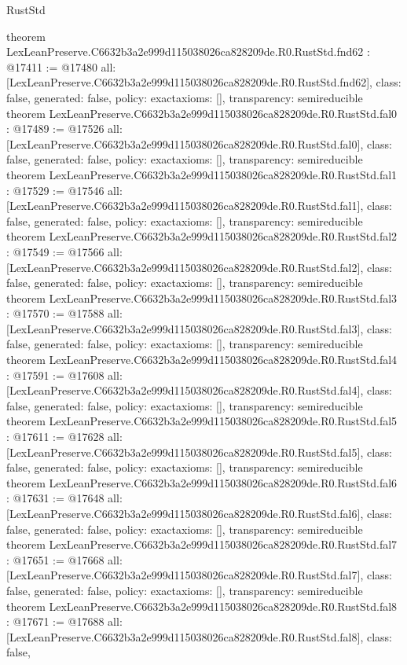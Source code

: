 \begin{lexlean}{RustStd}
\begin{coremodule}
{}
theorem LexLeanPreserve.C6632b3a2e999d115038026ca828209de.R0.RustStd.fnd62 : @17411 := @17480 {
  all: [LexLeanPreserve.C6632b3a2e999d115038026ca828209de.R0.RustStd.fnd62],
  class: false,
  generated: false,
  policy: exact{axioms: []},
  transparency: semireducible
}
theorem LexLeanPreserve.C6632b3a2e999d115038026ca828209de.R0.RustStd.fal0 : @17489 := @17526 {
  all: [LexLeanPreserve.C6632b3a2e999d115038026ca828209de.R0.RustStd.fal0],
  class: false,
  generated: false,
  policy: exact{axioms: []},
  transparency: semireducible
}
theorem LexLeanPreserve.C6632b3a2e999d115038026ca828209de.R0.RustStd.fal1 : @17529 := @17546 {
  all: [LexLeanPreserve.C6632b3a2e999d115038026ca828209de.R0.RustStd.fal1],
  class: false,
  generated: false,
  policy: exact{axioms: []},
  transparency: semireducible
}
theorem LexLeanPreserve.C6632b3a2e999d115038026ca828209de.R0.RustStd.fal2 : @17549 := @17566 {
  all: [LexLeanPreserve.C6632b3a2e999d115038026ca828209de.R0.RustStd.fal2],
  class: false,
  generated: false,
  policy: exact{axioms: []},
  transparency: semireducible
}
theorem LexLeanPreserve.C6632b3a2e999d115038026ca828209de.R0.RustStd.fal3 : @17570 := @17588 {
  all: [LexLeanPreserve.C6632b3a2e999d115038026ca828209de.R0.RustStd.fal3],
  class: false,
  generated: false,
  policy: exact{axioms: []},
  transparency: semireducible
}
theorem LexLeanPreserve.C6632b3a2e999d115038026ca828209de.R0.RustStd.fal4 : @17591 := @17608 {
  all: [LexLeanPreserve.C6632b3a2e999d115038026ca828209de.R0.RustStd.fal4],
  class: false,
  generated: false,
  policy: exact{axioms: []},
  transparency: semireducible
}
theorem LexLeanPreserve.C6632b3a2e999d115038026ca828209de.R0.RustStd.fal5 : @17611 := @17628 {
  all: [LexLeanPreserve.C6632b3a2e999d115038026ca828209de.R0.RustStd.fal5],
  class: false,
  generated: false,
  policy: exact{axioms: []},
  transparency: semireducible
}
theorem LexLeanPreserve.C6632b3a2e999d115038026ca828209de.R0.RustStd.fal6 : @17631 := @17648 {
  all: [LexLeanPreserve.C6632b3a2e999d115038026ca828209de.R0.RustStd.fal6],
  class: false,
  generated: false,
  policy: exact{axioms: []},
  transparency: semireducible
}
theorem LexLeanPreserve.C6632b3a2e999d115038026ca828209de.R0.RustStd.fal7 : @17651 := @17668 {
  all: [LexLeanPreserve.C6632b3a2e999d115038026ca828209de.R0.RustStd.fal7],
  class: false,
  generated: false,
  policy: exact{axioms: []},
  transparency: semireducible
}
theorem LexLeanPreserve.C6632b3a2e999d115038026ca828209de.R0.RustStd.fal8 : @17671 := @17688 {
  all: [LexLeanPreserve.C6632b3a2e999d115038026ca828209de.R0.RustStd.fal8],
  class: false,
}
\end{coremodule}
\end{lexlean}
